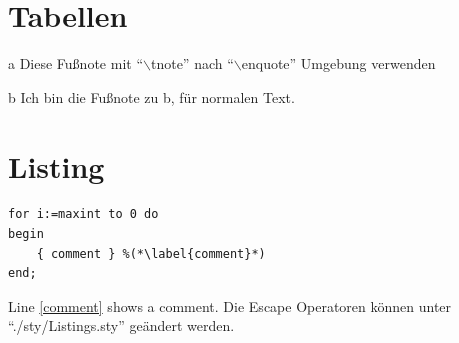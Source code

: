 \documentclass[./\jobname.tex]{subfiles}
\begin{document}
\chapter{Tabellen}
%
\begin{table}[H]
	\centering
	\noindent{}
	\label{tab: Tabelle A}
\end{table}
%
%
\begin{table}[H]
	\centering
	\begin{threeparttable}
		\label{tab: Tabelle B}
		\begin{tablenotes}
			\item [a] Diese Fußnote mit \enquote{\(\backslash\)tnote} nach \enquote{\(\backslash\)enquote} Umgebung verwenden
			\item [b] Ich bin die Fußnote zu b, für normalen Text.
		\end{tablenotes}
	\end{threeparttable}
\end{table}
%
\chapter{Listing}
%
\begin{lstlisting}[caption={example}]
for i:=maxint to 0 do
begin
	{ comment } %(*\label{comment}*)
end;
\end{lstlisting}
%
Line \ref{comment} shows a comment. Die Escape Operatoren können unter \enquote{./sty/Listings.sty} geändert werden. 
%
\end{document}
